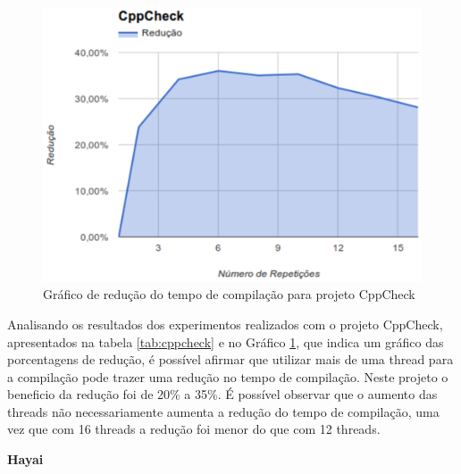\begin{figure}[h]
    \centering
        \includegraphics[keepaspectratio=true,scale=1]{figuras/cppcheck.eps}
    \caption{Gráfico de redução do tempo de compilação para projeto CppCheck}
    \label{cppcheck}
\end{figure}

Analisando os resultados dos experimentos realizados com o projeto
 CppCheck, apresentados na tabela \ref{tab:cppcheck} e no Gráfico \ref{cppcheck},
 que indica um gráfico das porcentagens de redução, é
 possível afirmar que utilizar mais de uma thread para a
 compilação pode trazer uma redução no tempo de compilação.
 Neste projeto o beneficio da redução foi de 20\% a 35\%.
 É possível observar que o aumento das threads  não
 necessariamente aumenta a redução do tempo de compilação,
 uma vez que com 16 threads  a redução foi menor  do que com 12 threads.


\textbf{Hayai}


